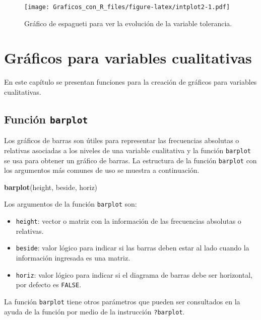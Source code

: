 \documentclass[10pt,]{krantz}
\makeatletter
\newenvironment{Shaded}{\begin{snugshade}}{\end{snugshade}}
\newcommand{\KeywordTok}[1]{\textcolor[rgb]{0.13,0.29,0.53}{\textbf{{#1}}}}
\newcommand{\NormalTok}[1]{{#1}}
\providecommand{\tightlist}{%
  \setlength{\itemsep}{0pt}\setlength{\parskip}{0pt}}
\newenvironment{kframe}{%
\medskip{}
\setlength{\fboxsep}{.8em}
 \def\at@end@of@kframe{}%
 \ifinner\ifhmode%
  \def\at@end@of@kframe{\end{minipage}}%
  \begin{minipage}{\columnwidth}%
 \fi\fi%
 \def\FrameCommand##1{\hskip\@totalleftmargin \hskip-\fboxsep
 \colorbox{shadecolor}{##1}\hskip-\fboxsep
     \hskip-\linewidth \hskip-\@totalleftmargin \hskip\columnwidth}%
 \MakeFramed {\advance\hsize-\width
   \@totalleftmargin\z@ \linewidth\hsize
   \@setminipage}}%
 {\par\unskip\endMakeFramed%
 \at@end@of@kframe}
\renewenvironment{Shaded}{\begin{kframe}}{\end{kframe}}
\makeatother
\begin{document}
\begin{figure}[htbp]
\centering
\texttt{[image: Graficos\_con\_R\_files/figure-latex/intplot2-1.pdf]}
\caption{\label{fig:intplot2}Gráfico de espagueti para ver la evolución de
la variable tolerancia.}
\end{figure}

\chapter{Gráficos para variables
cualitativas}\label{graficos-para-variables-cualitativas}

En este capítulo se presentan funciones para la creación de gráficos
para variables cualitativas.

\section{\texorpdfstring{Función \texttt{barplot}
}{Función barplot  }}\label{funcion-barplot}

Los gráficos de barras son útiles para representar las frecuencias
absolutas o relativas asociadas a los niveles de una variable
cualitativa y la función \texttt{barplot} se usa para obtener un gráfico
de barras. La estructura de la función \texttt{barplot} con los
argumentos más comunes de uso se muestra a continuación.

\begin{Shaded}
\begin{Highlighting}[]
\KeywordTok{barplot}\NormalTok{(height, beside, horiz)}
\end{Highlighting}
\end{Shaded}

Los argumentos de la función \texttt{barplot} son:

\begin{itemize}
\tightlist
\item
  \texttt{height}: vector o matriz con la información de las frecuencias
  absolutas o relativas.
\item
  \texttt{beside}: valor lógico para indicar si las barras deben estar
  al lado cuando la información ingresada es una matriz.
\item
  \texttt{horiz}: valor lógico para indicar si el diagrama de barras
  debe ser horizontal, por defecto es \texttt{FALSE}.
\end{itemize}

La función \texttt{barplot} tiene otros parámetros que pueden ser
consultados en la ayuda de la función por medio de la instrucción
\texttt{?barplot}.
\end{document}
